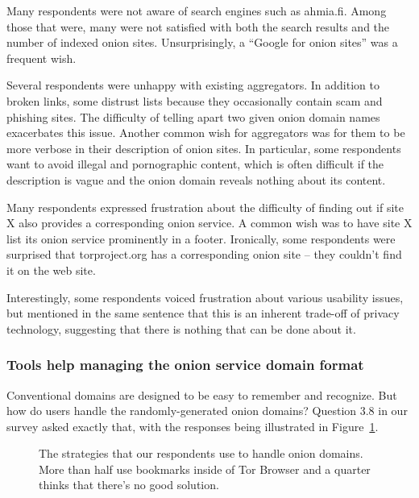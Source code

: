 Many respondents were not aware of search engines such as ahmia.fi.  Among those
that were, many were not satisfied with both the search results and the number
of indexed onion sites.  Unsurprisingly, a ``Google for onion sites'' was a
frequent wish.

Several respondents were unhappy with existing aggregators.  In addition to
broken links, some distrust lists because they occasionally contain scam and
phishing sites.  The difficulty of telling apart two given onion domain names
exacerbates this issue.  Another common wish for aggregators was for them to be
more verbose in their description of onion sites.  In particular, some
respondents want to avoid illegal and pornographic content, which is often
difficult if the description is vague and the onion domain reveals nothing about
its content.

Many respondents expressed frustration about the difficulty of finding out if
site X also provides a corresponding onion service.  A common wish was to have
site X list its onion service prominently in a footer.  Ironically, some
respondents were surprised that torproject.org has a corresponding onion site --
they couldn't find it on the web site.

Interestingly, some respondents voiced frustration about various usability
issues, but mentioned in the same sentence that this is an inherent trade-off of
privacy technology, suggesting that there is nothing that can be done about it.

\subsubsection{Tools help managing the onion service domain format}


Conventional domains are designed to be easy to remember and recognize.  But how
do users handle the randomly-generated onion domains?  Question 3.8 in our
survey asked exactly that, with the responses being illustrated in
Figure~\ref{fig:onion-domain-mgmt}.

\begin{figure}[t]
    \centering
    
    \caption{The strategies that our respondents use to handle onion domains.
    More than half use bookmarks inside of Tor Browser and a quarter thinks that
    there's no good solution.}
    \label{fig:onion-domain-mgmt}
\end{figure}

